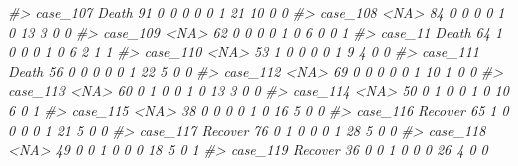 \documentclass[]{book}
\newenvironment{Shaded}{\begin{snugshade}}{\end{snugshade}}
\newcommand{\CommentTok}[1]{\textcolor[rgb]{0.56,0.35,0.01}{\textit{#1}}}
\begin{document}
\begin{Shaded}
\begin{Highlighting}[]
\CommentTok{#> case_107   Death  91        0        0                0                 0                 0              1                    21                     10           0             0}
\CommentTok{#> case_108    <NA>  84        0        0                0                 0                 1              0                    13                      3           0             0}
\CommentTok{#> case_109    <NA>  62        0        0                0                 0                 1              0                     6                      0           0             1}
\CommentTok{#> case_11    Death  64        1        0                0                 0                 1              0                     6                      2           1             1}
\CommentTok{#> case_110    <NA>  53        1        0                0                 0                 0              1                     9                      4           0             0}
\CommentTok{#> case_111   Death  56        0        0                0                 0                 0              1                    22                      5           0             0}
\CommentTok{#> case_112    <NA>  69        0        0                0                 0                 0              1                    10                      1           0             0}
\CommentTok{#> case_113    <NA>  60        0        1                0                 0                 1              0                    13                      3           0             0}
\CommentTok{#> case_114    <NA>  50        0        1                0                 0                 1              0                    10                      6           0             1}
\CommentTok{#> case_115    <NA>  38        0        0                0                 0                 1              0                    16                      5           0             0}
\CommentTok{#> case_116 Recover  65        1        0                0                 0                 0              1                    21                      5           0             0}
\CommentTok{#> case_117 Recover  76        0        1                0                 0                 0              1                    28                      5           0             0}
\CommentTok{#> case_118    <NA>  49        0        0                1                 0                 0              0                    18                      5           0             1}
\CommentTok{#> case_119 Recover  36        0        0                1                 0                 0              0                    26                      4           0             0}

\end{Highlighting}
\end{Shaded}
\end{document}
